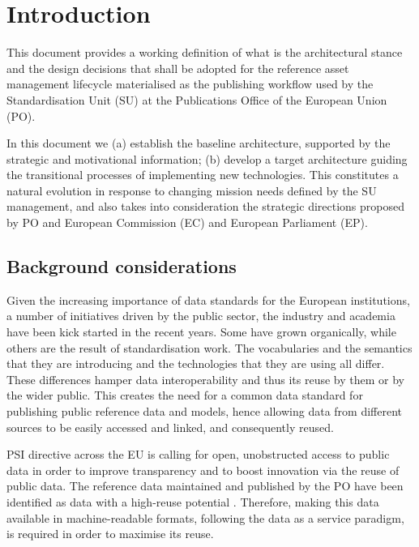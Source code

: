 \section{Introduction}
\label{sec:introduction}
	
	This document provides a working definition of what is the architectural stance and the design decisions that shall be adopted for the reference asset management lifecycle materialised as the publishing workflow used by the Standardisation Unit (SU) at the Publications Office of the European Union (PO).
	
	In this document we (a) establish the baseline architecture, supported by the strategic and motivational information; (b) develop a target architecture guiding the transitional processes of implementing new technologies. This constitutes a natural evolution in response to changing mission needs defined by the SU management, and also takes into consideration the strategic directions proposed by PO and European Commission (EC) and European Parliament (EP).
	
	
	\subsection{Background considerations}
	
	Given the increasing importance of data standards for the European institutions, a number of initiatives driven by the public sector, the industry and academia have been kick started in the recent years. Some have grown organically, while others are the result of standardisation work. The vocabularies and the semantics that they are introducing and the technologies that they are using all differ. These differences hamper data interoperability and thus its reuse by them or by the wider public. This creates the need for a common data standard for publishing public reference data and models, hence allowing data from different sources to be easily accessed and linked, and consequently reused.
	
	PSI directive \cite{directive-2013/37/EU} across the EU is calling for open, unobstructed access to public data in order to improve transparency and to boost innovation via the reuse of public data. The reference data maintained and published by the PO have been identified as data with a high-reuse potential \cite{d-high-value-assets}. Therefore, making this data available in machine-readable formats, following the data as a service paradigm, is required in order to maximise its reuse.
	
